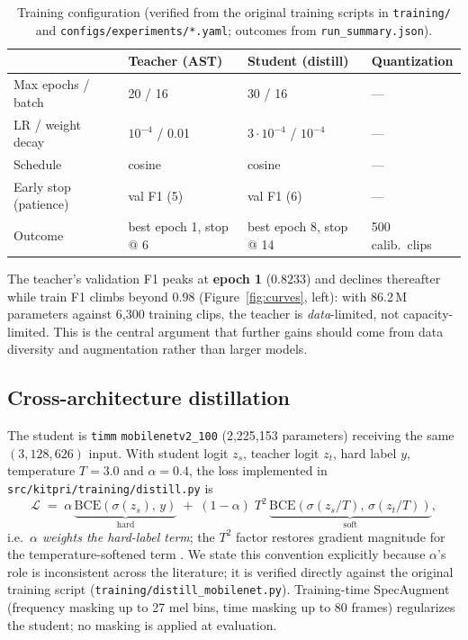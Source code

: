 \documentclass[11pt,a4paper]{article}
\begin{document}
\begin{table}[h]
\centering\small
\begin{tabular}{@{}llll@{}}
\toprule
 & \textbf{Teacher (AST)} & \textbf{Student (distill)} & \textbf{Quantization} \\
\midrule
Max epochs / batch     & 20 / 16        & 30 / 16       & --- \\
LR / weight decay      & $10^{-4}$ / 0.01 & $3{\cdot}10^{-4}$ / $10^{-4}$ & --- \\
Schedule               & cosine         & cosine        & --- \\
Early stop (patience)  & val F1 (5)     & val F1 (6)    & --- \\
Outcome                & best epoch 1, stop @ 6 & best epoch 8, stop @ 14 & 500 calib.\ clips \\
\bottomrule
\end{tabular}
\caption{Training configuration (verified from the original training scripts
in \texttt{training/} and \texttt{configs/experiments/*.yaml}; outcomes from
\texttt{run\_summary.json}).}
\label{tab:hyper}
\end{table}

The teacher's validation F1 peaks at \textbf{epoch 1} ($0.8233$) and declines
thereafter while train F1 climbs beyond $0.98$
(Figure~\ref{fig:curves}, left): with 86.2\,M parameters against 6{,}300
training clips, the teacher is \emph{data}-limited, not capacity-limited. This
is the central argument that further gains should come from data diversity
and augmentation rather than larger models.

\subsection{Cross-architecture distillation}\label{sec:distill}

The student is \texttt{timm} \texttt{mobilenetv2\_100}
(2{,}225{,}153 parameters) receiving the same $(3,128,626)$ input. With
student logit $z_s$, teacher logit $z_t$, hard label $y$, temperature
$T{=}3.0$ and $\alpha{=}0.4$, the loss implemented in
\texttt{src/kitpri/training/distill.py} is
\begin{equation}
\mathcal{L} \;=\; \alpha\,\underbrace{\mathrm{BCE}\!\left(\sigma(z_s),\, y\right)}_{\text{hard}}
\;+\; (1-\alpha)\; T^2\,
\underbrace{\mathrm{BCE}\!\left(\sigma(z_s/T),\, \sigma(z_t/T)\right)}_{\text{soft}} ,
\label{eq:kd}
\end{equation}
i.e.\ \emph{$\alpha$ weights the hard-label term}; the $T^2$ factor restores
gradient magnitude for the temperature-softened term
\cite{hinton2015distilling}. We state this convention explicitly because
$\alpha$'s role is inconsistent across the literature; it is verified directly
against the original training script
(\texttt{training/distill\_mobilenet.py}). Training-time SpecAugment
(frequency masking up to 27 mel bins, time masking up to 80 frames)
regularizes the student; no masking is applied at evaluation.
\end{document}
